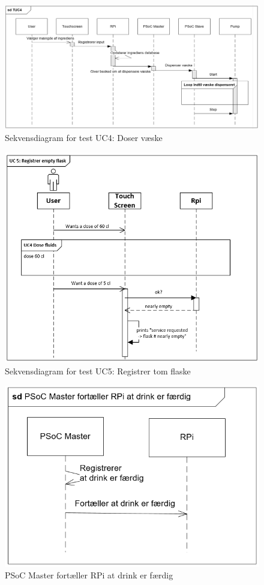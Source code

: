 \begin{figure}[H]
	\centering
	\includegraphics[width=1\textwidth]{Images/TUC4.png}
	\caption{Sekvensdiagram for test UC4: Doser væske}
	\label{fig:testUC4}
\end{figure}
\begin{figure}[H]
	\centering
	\includegraphics[width=1\textwidth]{Images/testUC5.png}
	\caption{Sekvensdiagram for test UC5: Registrer tom flaske}
	\label{fig:testUC5}
\end{figure}

\begin{figure}[H]
    \centering
    \includegraphics[width=1\textwidth]{Images/sdTestUC6.png}
    \caption{PSoC Master fortæller RPi at drink er færdig}
    \label{fig:testUC6}
\end{figure}